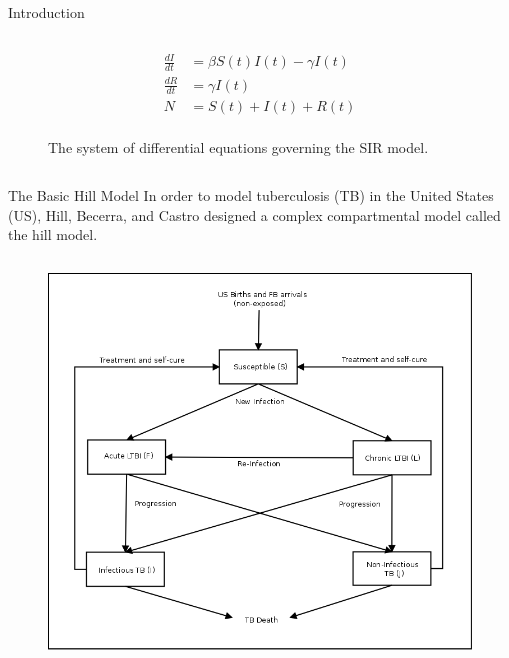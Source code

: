 \documentclass[final]{beamer}
\begin{document}
\begin{frame}
\begin{columns}
\begin{column}{.3\textwidth}
\begin{block}{Introduction}
\begin{block}{}
\begin{column}{.39\textwidth}
\begin{figure}[h]
\begin{align*}
                \frac{dI}{dt} &= \beta S(t)I(t) - \gamma I(t) \\
                \frac{dR}{dt} &= \gamma I(t)\\
                N             &= S(t) + I(t) + R(t)\\
              \end{align*}
              \caption{The system of differential equations governing the SIR
                       model.}
              \label{eq:SIRdes}
            \end{figure}
          \end{column}
        \end{block}
      \end{block}
      
      \begin{block}{The Basic Hill Model}
        In order to model tuberculosis (TB) in the United States (US), Hill,
        Becerra, and Castro designed a complex compartmental model called the
        hill model. 
        \vspace{-2em}
        \begin{block}{}
          \begin{column}{.6\textwidth}
            \begin{figure}[h]
              \begin{center}
                \includegraphics[scale=.5]{HillModelFlowChart}
              \end{center}

\end{figure}
\end{column}
\end{block}
\end{block}
\end{column}
\end{columns}
\end{frame}
\end{document}
